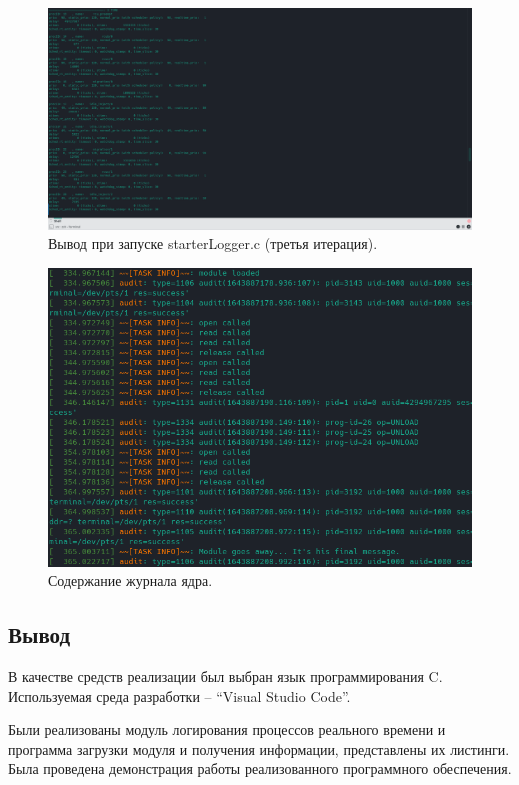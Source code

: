 \begin{figure}[H]
	\centering
	\includegraphics[scale=0.5, angle=-90]{img/thirdIt.png}
	\caption{Вывод при запуске starterLogger.c (третья итерация). }
	\label{fig:thirdIt}
\end{figure}

\begin{figure}[H]
	\centering
	\includegraphics[scale=0.8]{img/dmesg.png}
	\caption{Содержание журнала ядра. }
	\label{fig:dmesg}
\end{figure}

\subsection*{Вывод}
В качестве средств реализации был выбран язык программирования C. Используемая среда разработки -- ``Visual Studio Code''.

Были реализованы модуль логирования процессов реального времени и программа загрузки модуля и получения информации, представлены их листинги. Была проведена демонстрация работы реализованного программного обеспечения.